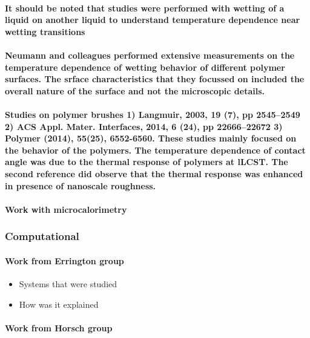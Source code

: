 \documentclass[a4paper,12pt,single,pdftex]{scrartcl}
\begin{document}
\label{ID_1486553890}\paragraph{It should be noted that studies were performed with wetting of a liquid on another liquid to understand temperature dependence near wetting transitions}

\label{ID_121688724}\paragraph{Neumann and colleagues performed extensive measurements on the temperature dependence of wetting behavior of different polymer surfaces. The srface characteristics that they focussed on included the overall nature of the surface and  not the microscopic details.}

\label{ID_1725362775}\paragraph{Studies on polymer brushes 1) Langmuir, 2003, 19 (7), pp 2545–2549 2) ACS Appl. Mater. Interfaces, 2014, 6 (24), pp 22666–22672  3) Polymer (2014), 55(25), 6552-6560. These studies mainly focused on the behavior of the polymers. The temperature dependence of contact angle was due to the thermal response of polymers at lLCST. The second reference did observe that the thermal response was enhanced in presence of nanoscale roughness.}

\label{ID_1314084600}\paragraph{Work with microcalorimetry}

\label{ID_1521593594}\subsubsection{Computational}

\label{ID_1690050024}\paragraph{Work from Errington group}

\begin{itemize}
\label{ID_473109498}\item Systems that were studied
\label{ID_1487682070}\item How was it explained
\end{itemize}
\label{ID_473109498}\label{ID_1487682070}\label{ID_980454220}\paragraph{Work from Horsch group}
\end{document}

